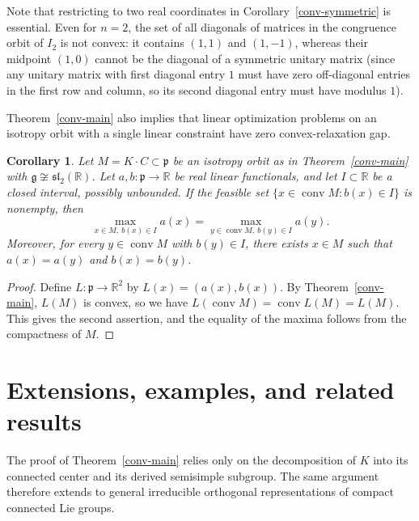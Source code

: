 \documentclass[11pt,reqno]{amsart}
\newtheorem{corollary}[theorem]{Corollary}
\theoremstyle{remark}
\newcommand{\R}{\mathbb R}
\newcommand{\gfr}{\mathfrak g}
\newcommand{\pfr}{\mathfrak p}
\DeclareMathOperator{\conv}{conv}
\begin{document}
Note that restricting to two real coordinates in
Corollary~\ref{conv-symmetric} is essential. Even for $n=2$, the set of
all diagonals of matrices in the congruence orbit of $I_2$ is not
convex: it contains $(1,1)$ and $(1,-1)$, whereas their midpoint $(1,0)$
cannot be the diagonal of a symmetric unitary matrix (since any unitary
matrix with first diagonal entry $1$ must have zero off-diagonal entries
in the first row and column, so its second diagonal entry must have
modulus $1$).

Theorem~\ref{conv-main} also implies that linear optimization problems
on an isotropy orbit with a single linear constraint have zero
convex-relaxation gap.

\begin{corollary}\label{conv-optimization}
Let $M=K\cdot C\subset\pfr$ be an isotropy orbit as in
Theorem~\ref{conv-main} with $\gfr\not\cong\mathfrak{sl}_2(\R)$.
Let $a,b:\pfr\to\R$ be real linear functionals, and let $I\subset\R$ be
a closed interval, possibly unbounded. If the feasible set
$\{x\in\conv M:b(x)\in I\}$ is nonempty, then
\[
 \max_{x\in M,\ b(x)\in I}a(x)
 =\max_{y\in\conv M,\ b(y)\in I}a(y).
\]
Moreover, for every $y\in\conv M$ with $b(y)\in I$, there exists
$x\in M$ such that $a(x)=a(y)$ and $b(x)=b(y)$.
\end{corollary}
\begin{proof}
Define $L:\pfr\to\R^2$ by $L(x)=(a(x),b(x))$. By
Theorem~\ref{conv-main}, $L(M)$ is convex, so we have
$L(\conv M)=\conv L(M)=L(M)$. This gives the second assertion, and the
equality of the maxima follows from the compactness of $M$.
\end{proof}

\section{Extensions, examples, and related results}\label{sec:extensions}

The proof of Theorem~\ref{conv-main} relies only on the decomposition of
$K$ into its connected center and its derived semisimple subgroup. The
same argument therefore extends to general irreducible orthogonal
representations of compact connected Lie groups.
\end{document}
